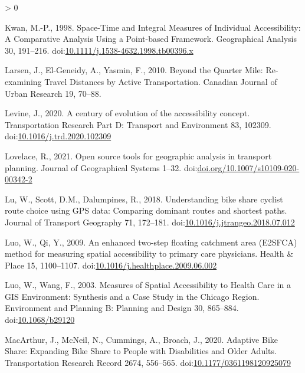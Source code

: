 \documentclass[]{elsarticle} %
\newlength{\cslhangindent}
\newenvironment{CSLReferences}[2] %
 {%
  \setlength{\parindent}{0pt}
  \ifodd #1 \everypar{\setlength{\hangindent}{\cslhangindent}}\ignorespaces\fi
  \ifnum #2 > 0
  \setlength{\parskip}{#2\baselineskip}
  \fi
 }%
 {}
\begin{document}
\begin{CSLReferences}{1}{0}
\leavevmode\hypertarget{ref-kwanSpaceTimeIntegral1998}{}%
Kwan, M.-P., 1998. Space-{Time} and {Integral Measures} of {Individual
Accessibility}: {A Comparative Analysis Using} a {Point}-based
{Framework}. Geographical Analysis 30, 191--216.
doi:\href{https://doi.org/10.1111/j.1538-4632.1998.tb00396.x}{10.1111/j.1538-4632.1998.tb00396.x}

\leavevmode\hypertarget{ref-larsenQuarterMileReexamining2010}{}%
Larsen, J., El-Geneidy, A., Yasmin, F., 2010. Beyond the {Quarter Mile}:
{Re}-examining {Travel Distances} by {Active Transportation}. Canadian
Journal of Urban Research 19, 70--88.

\leavevmode\hypertarget{ref-levineCenturyEvolutionAccessibility2020}{}%
Levine, J., 2020. A century of evolution of the accessibility concept.
Transportation Research Part D: Transport and Environment 83, 102309.
doi:\href{https://doi.org/10.1016/j.trd.2020.102309}{10.1016/j.trd.2020.102309}

\leavevmode\hypertarget{ref-lovelace2021open}{}%
Lovelace, R., 2021. Open source tools for geographic analysis in
transport planning. Journal of Geographical Systems 1--32.
doi:\href{https://doi.org/doi.org/10.1007/s10109-020-00342-2}{doi.org/10.1007/s10109-020-00342-2}

\leavevmode\hypertarget{ref-luUnderstandingBikeShare2018}{}%
Lu, W., Scott, D.M., Dalumpines, R., 2018. Understanding bike share
cyclist route choice using {GPS} data: {Comparing} dominant routes and
shortest paths. Journal of Transport Geography 71, 172--181.
doi:\href{https://doi.org/10.1016/j.jtrangeo.2018.07.012}{10.1016/j.jtrangeo.2018.07.012}

\leavevmode\hypertarget{ref-luoEnhancedTwostepFloating2009}{}%
Luo, W., Qi, Y., 2009. An enhanced two-step floating catchment area
({E2SFCA}) method for measuring spatial accessibility to primary care
physicians. Health \& Place 15, 1100--1107.
doi:\href{https://doi.org/10.1016/j.healthplace.2009.06.002}{10.1016/j.healthplace.2009.06.002}

\leavevmode\hypertarget{ref-luoMeasuresSpatialAccessibility2003}{}%
Luo, W., Wang, F., 2003. Measures of {Spatial Accessibility} to {Health
Care} in a {GIS Environment}: {Synthesis} and a {Case Study} in the
{Chicago Region}. Environment and Planning B: Planning and Design 30,
865--884. doi:\href{https://doi.org/10.1068/b29120}{10.1068/b29120}

\leavevmode\hypertarget{ref-macarthurAdaptiveBikeShare2020}{}%
MacArthur, J., McNeil, N., Cummings, A., Broach, J., 2020. Adaptive
{Bike Share}: {Expanding Bike Share} to {People} with {Disabilities} and
{Older Adults}. Transportation Research Record 2674, 556--565.
doi:\href{https://doi.org/10.1177/0361198120925079}{10.1177/0361198120925079}


\end{CSLReferences}
\end{document}
